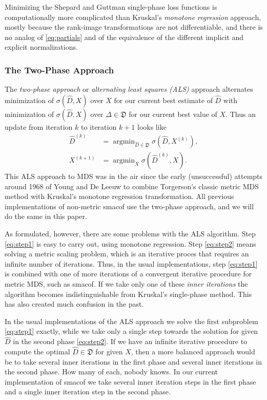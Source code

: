 \documentclass[
  12pt,
]{article}
\begin{document}
Minimizing the Shepard and Guttman single-phase loss functions is
computationally more complicated than Kruskal's \emph{monotone regression}
approach, mostly because the rank-image transformations are not differentiable,
and there is no analog of \eqref{eq:partials} and of the equivalence of
the different implicit and explicit normalizations.

\subsubsection{The Two-Phase Approach}\label{the-two-phase-approach}

The \emph{two-phase approach} or \emph{alternating least squares (ALS)} approach
alternates minimization of \(\sigma(\hat D,X)\) over \(X\) for our current
best estimate of \(\hat D\) with minimization of \(\sigma(\hat D,X)\) over
\(\Delta\in\mathfrak{D}\) for our current best value of \(X\). Thus an
update from iteration \(k\) to iteration \(k+1\) looks like
\begin{align}
\hat D^{(k)}&=\mathop{\text{argmin}}_{\hat D\in\mathfrak{D}}\sigma(\hat D,X^{(k)}),\label{eq:step1}\\
X^{(k+1)}&=\mathop{\text{argmin}}_X\sigma(\hat D^{(k)},X).\label{eq:step2}
\end{align}
This ALS approach to MDS was in the air since the early
(unsuccessful) attempts around 1968 of Young and De Leeuw to combine
Torgerson's classic metric MDS method with Kruskal's monotone regression
transformation. All previous implementations of non-metric smacof
use the two-phase approach, and we will do the same in this paper.

As formulated, however, there are some problems with the ALS algorithm.
Step \eqref{eq:step1} is easy to carry out, using monotone regression.
Step \eqref{eq:step2} means solving a metric scaling problem, which is an
iterative proces that requires an infinite number of iterations. Thus,
in the usual implementations, step \eqref{eq:step1} is combined with one
of more iterations of a convergent iterative procedure for metric MDS,
such as smacof. If we take only one of these \emph{inner iterations} the
algorithm becomes indistinguishable from Kruskal's single-phase method.
This has also created much confusion in the past.

In the usual implementations of the ALS approach we solve the first
subproblem \eqref{eq:step1} exactly, while we take only a single step
towards the solution for given \(\hat D\) in the second phase
\eqref{eq:step2}. If we have an infinite iterative procedure to compute
the optimal \(\hat D\in\mathfrak{D}\) for given \(X\), then a more balanced
approach would be to take several inner iterations in the first phase and
several inner iterations in the second phase. How many of each, nobody
knows. In our current implementation of smacof we take several inner
iteration steps in the first phase and a single inner iteration step
in the second phase.
\end{document}
